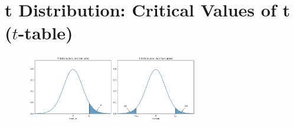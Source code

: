 \section{t Distribution: Critical Values of t ($t$-table)}

\changefontsizes{6.5pt}




\begin{figure}[H]
    \centering
    \includegraphics[width=\linewidth, height=3cm, keepaspectratio]{Pictures/distributions/img_t_scores_tails.jpg}
\end{figure}



